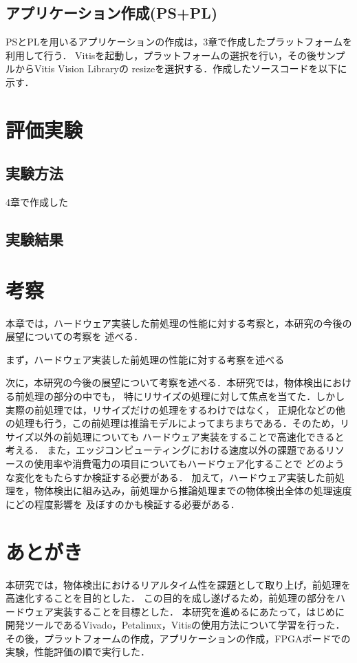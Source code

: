\documentclass[11pt,a4j]{jreport}
\begin{document}
\section{アプリケーション作成(PS+PL)}
PSとPLを用いるアプリケーションの作成は，3章で作成したプラットフォームを利用して行う．
Vitisを起動し，プラットフォームの選択を行い，その後サンプルからVitis Vision Libraryの
resizeを選択する．作成したソースコードを以下に示す．
%
%
%
\chapter{評価実験}
\section{実験方法}
4章で作成した
\section{実験結果}
%
\chapter{考察}
本章では，ハードウェア実装した前処理の性能に対する考察と，本研究の今後の展望についての考察を
述べる．

まず，ハードウェア実装した前処理の性能に対する考察を述べる

次に，本研究の今後の展望について考察を述べる．本研究では，物体検出における前処理の部分の中でも，
特にリサイズの処理に対して焦点を当てた．しかし実際の前処理では，リサイズだけの処理をするわけではなく，
正規化などの他の処理も行う，この前処理は推論モデルによってまちまちである．そのため，リサイズ以外の前処理についても
ハードウェア実装をすることで高速化できると考える．
また，エッジコンピューティングにおける速度以外の課題であるリソースの使用率や消費電力の項目についてもハードウェア化することで
どのような変化をもたらすか検証する必要がある．
加えて，ハードウェア実装した前処理を，物体検出に組み込み，前処理から推論処理までの物体検出全体の処理速度にどの程度影響を
及ぼすのかも検証する必要がある．
\chapter{あとがき}
本研究では，物体検出におけるリアルタイム性を課題として取り上げ，前処理を高速化することを目的とした．
この目的を成し遂げるため，前処理の部分をハードウェア実装することを目標とした．
本研究を進めるにあたって，はじめに開発ツールであるVivado，Petalinux，Vitisの使用方法について学習を行った．
その後，プラットフォームの作成，アプリケーションの作成，FPGAボードでの実験，性能評価の順で実行した．
\end{document}

